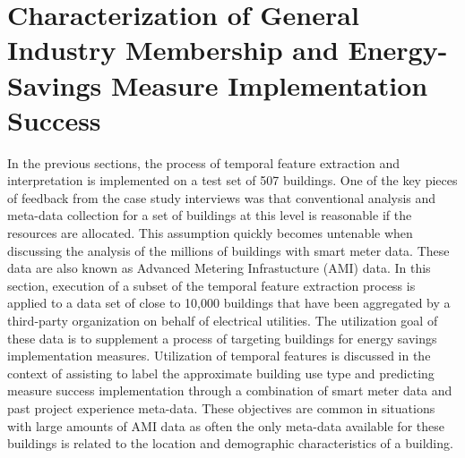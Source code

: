 \section{Characterization of General Industry Membership and Energy-Savings Measure Implementation Success}
\label{sec:scalability}

In the previous sections, the process of temporal feature extraction and interpretation is implemented on a test set of 507 buildings. One of the key pieces of feedback from the case study interviews was that conventional analysis and meta-data collection for a set of buildings at this level is reasonable if the resources are allocated. This assumption quickly becomes untenable when discussing the analysis of the millions of buildings with smart meter data. These data are also known as Advanced Metering Infrastucture (AMI) data.  In this section, execution of a subset of the temporal feature extraction process is applied to a data set of close to 10,000 buildings that have been aggregated by a third-party organization on behalf of electrical utilities. The utilization goal of these data is to supplement a process of targeting buildings for energy savings implementation measures. Utilization of temporal features is discussed in the context of assisting to label the approximate building use type and predicting measure success implementation through a combination of smart meter data and past project experience meta-data. These objectives are common in situations with large amounts of AMI data as often the only meta-data available for these buildings is related to the location and demographic characteristics of a building. 


